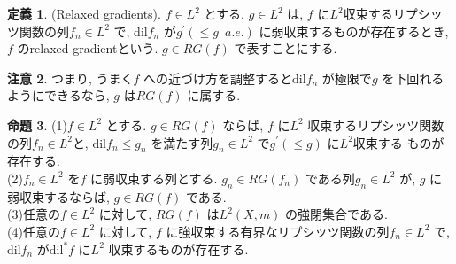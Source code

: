 \documentclass[10pt, fleqn, label-section=none]{bxjsarticle}
\theoremstyle{definition}
\newtheorem{dfn}{定義}[section]
\newtheorem{prop}[dfn]{命題}
\newtheorem{remark}[dfn]{注意}
\newcommand{\dil}{\textrm{dil}}
\renewcommand{\;}{\, ; \,}
\begin{document}
\begin{dfn}(Relaxed gradients). $f \in L^2$ とする. $g \in L^2$ は, $f$ に$L^2$収束するリプシッツ関数の列$f_n \in L^2$ で, $\dil f_n$ が$g^\prime (\leq g \,\,\, a.e.)$ に弱収束するものが存在するとき, $f$ のrelaxed gradientという. $g \in RG(f)$ で表すことにする. 
\end{dfn}

\begin{remark}
つまり, うまく$f$ への近づけ方を調整すると$\dil f_n$ が極限で$g$ を下回れるようにできるなら, $g$ は$RG(f)$ に属する. 
\end{remark}


\begin{prop}
(1)$f \in L^2$ とする. $g \in RG(f)$ ならば, $f$ に$L^2$ 収束するリプシッツ関数の列$f_n \in L^2$と, $\dil f_n \leq g_n$ を満たす列$g_n \in L^2$ で$g^\prime (\leq g)$ に$L^2$収束する ものが存在する. \\
(2)$f_n \in L^2$ を$f$ に弱収束する列とする. $g_n \in RG(f_n)$ である列$g_n \in L^2$ が, $g$ に弱収束するならば, $g \in RG(f)$ である. \\
(3)任意の$f \in L^2$ に対して, $RG(f)$ は$L^2(X, m)$ の強閉集合である. \\
(4)任意の$f \in L^2$ に対して, $f$ に強収束する有界なリプシッツ関数の列$f_n \in L^2$ で, $\dil f_n$ が$\dil^* f$ に$L^2$ 収束するものが存在する. 
\end{prop}
\end{document}

